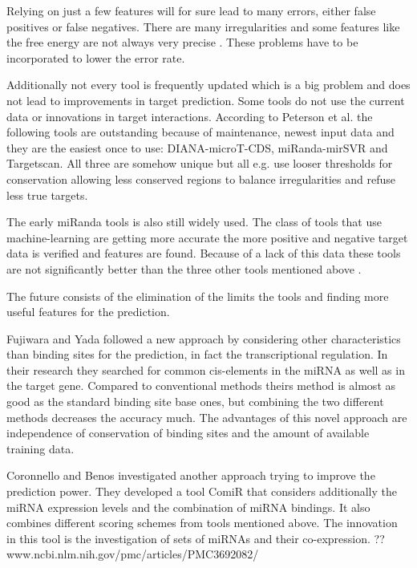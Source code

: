 \documentclass[12pt]{article}
\begin{document}
Relying on just a few features will for sure lead to many errors, either false positives or false negatives. There are many irregularities and some features like the free energy are not always very precise \cite{Peterson}. These problems have to be incorporated to lower the error rate.

Additionally not every tool is frequently updated which is a big problem and does not lead to improvements in target prediction. Some tools do not use the current data or innovations in target interactions. According to Peterson et al. \cite{Peterson} the following tools are outstanding because of maintenance, newest input data and they are the easiest once to use: DIANA-microT-CDS, miRanda-mirSVR and Targetscan. All three are somehow unique but all e.g. use looser thresholds for conservation allowing less conserved regions to balance irregularities and refuse less true targets.

The early miRanda tools is also still widely used. The class of tools that use machine-learning are getting more accurate the more positive and negative target data is verified and features are found. Because of a lack of this data these tools are not significantly better than the three other tools mentioned above \cite{Peterson}.

The future consists of the elimination of the limits the tools and finding more useful features for the prediction.

Fujiwara and Yada \cite{Fuji} followed a new approach by considering other characteristics than binding sites for the prediction, in fact the transcriptional regulation. In their research they searched for common cis-elements in the miRNA as well as in the target gene. Compared to conventional methods theirs method is almost as good as the standard binding site base ones, but combining the two different methods decreases the accuracy much. The advantages of this novel approach are independence of conservation of binding sites and the amount of available training data. 

Coronnello and Benos \cite{Coronnello} investigated another approach trying to improve the prediction power. They developed a tool ComiR that considers additionally the miRNA expression levels and the combination of miRNA bindings. It also combines different scoring schemes from tools mentioned above. The innovation in this tool is the investigation of sets of miRNAs and their co-expression. ?? www.ncbi.nlm.nih.gov/pmc/articles/PMC3692082/ \\
\end{document}
